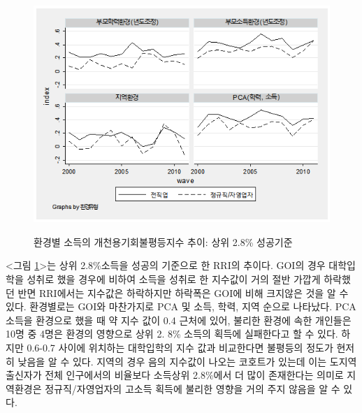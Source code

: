 \begin{figure}
    \centering
    \caption{환경별 소득의 개천용기회불평등지수 추이: 상위 2.8\% 성공기준}
    \includegraphics[width=\textwidth]{figure/gomse_rri_byenv_28.png}
    \label{fig:gomse_rri_byenv_28}
\end{figure}

 <그림 \ref{fig:gomse_rri_byenv_28}>는 상위 2.8\%소득을 성공의 기준으로 한 RRI의 추이다.
 GOI의 경우 대학입학을 성취로 했을 경우에 비하여 소득을 성취로 한 지수값이 거의 절반 가깝게 하락했던 반면 RRI에서는 지수값은 하락하지만 하락폭은 GOI에 비해 크지않은 것을 알 수 있다.
 환경별로는 GOI와 마찬가지로 PCA 및 소득, 학력, 지역 순으로 나타났다.
 PCA 소득을 환경으로 했을 때 약 지수 값이 0.4 근처에 있어, 불리한 환경에 속한 개인들은 10명 중 4명은 환경의 영향으로 상위 2. 8\% 소득의 획득에 실패한다고 할 수 있다.
 하지만 0.6-0.7 사이에 위치하는 대학입학의 지수 값과 비교한다면 불평등의 정도가 현저히 낮음을 알 수 있다.
 지역의 경우 음의 지수값이 나오는 코호트가 있는데 이는 도지역 출신자가 전체 인구에서의 비율보다 소득상위 2.8\%에서 더 많이 존재한다는 의미로 지역환경은 정규직/자영업자의 고소득 획득에 불리한 영향을 거의 주지 않음을 알 수 있다.


